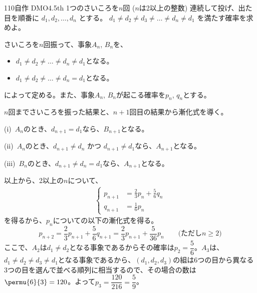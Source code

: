 \begin{prob}{110}{}{自作 DMO4.5th}
 1つのさいころを$n$回 ($n$は2以上の整数) 連続して投げ、出た目を順番に $d_1, d_2, \dots, d_n$ とする。 $d_1\neq d_2 \neq d_3 \neq \dots \neq d_n \neq d_1$ を満たす確率を求めよ。
\end{prob}
さいころを$n$回振って、事象$A_n$, $B_n$を、
\begin{itemize}
 \item[$A_n$:] $d_1\neq d_2\neq\dots\neq d_n\neq d_1$となる。 
 \item[$B_n$:] $d_1\neq d_2\neq\dots\neq d_n = d_1$となる。 
\end{itemize}
によって定める。また、事象$A_n$, $B_n$が起こる確率を$p_n$, $q_n$とする。

$n$回までさいころを振った結果と、$n+1$回目の結果から漸化式を導く。

(i)~$A_n$のとき、$d_{n+1}=d_1$なら、$B_{n+1}$となる。

(ii)~$A_n$のとき、$d_{n+1}\neq d_n$ かつ $d_{n+1}\neq d_1$なら、$A_{n+1}$となる。

(iii)~$B_n$のとき、$d_{n+1}\neq d_n = d_1$なら、$A_{n+1}$となる。

以上から、2以上の$n$について、
\begin{align*}
 \left\{
 \begin{aligned}
  p_{n+1}&=\frac{2}{3}p_n+\frac{5}{6}q_n \\
  q_{n+1}&=\frac{1}{6}p_n
 \end{aligned}
 \right.
\end{align*}
を得るから、$p_n$についての以下の漸化式を得る。
\[ p_{n+2}=\frac{2}{3}p_{n+1}+\frac{5}{6}q_{n+1}=\frac{2}{3}p_{n+1}+\frac{5}{36}p_n \qquad \text{(ただし$n\ge 2$)}\]
ここで、$A_2$は$d_1\neq d_2$となる事象であるからその確率は$p_2=\dfrac{5}{6}$。$A_3$は、$d_1\neq d_2\neq d_3\neq d_1$となる事象であるから、$(d_1, d_2, d_3)$の組は6つの目から異なる3つの目を選んで並べる順列に相当するので、その場合の数は$\permu{6}{3}=120$。よって$p_3=\dfrac{120}{216}=\dfrac{5}{9}$。

